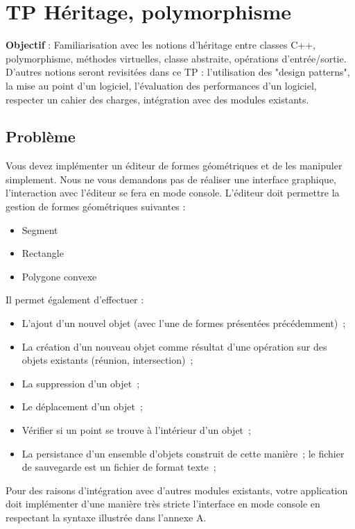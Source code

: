\documentclass[oneside]{book}
\begin{document}
 

\chapter*{TP Héritage, polymorphisme}
\textbf{Objectif} : Familiarisation avec les notions d'héritage entre classes C++, polymorphisme, méthodes virtuelles, classe abstraite, opérations d'entrée/sortie. D'autres notions seront revisitées dans ce TP : l'utilisation des "design patterns", la mise au point d'un logiciel, l'évaluation des performances d'un logiciel, respecter un cahier des charges, intégration avec des modules existants.

\section*{Problème}
Vous devez implémenter un éditeur de formes géométriques et de les manipuler simplement. Nous ne vous demandons pas de réaliser une interface graphique, l'interaction avec l'éditeur se fera en mode console.
L'éditeur doit permettre la gestion de formes géométriques suivantes :
\begin{itemize}
  \item Segment
  \item Rectangle
  \item Polygone convexe
\end{itemize}
Il permet également d'effectuer :
\begin{itemize}
  \item L'ajout d'un nouvel objet (avec l'une de formes présentées précédemment)~;
  \item La création d'un nouveau objet comme résultat d'une opération sur des objets existants (réunion, intersection)~;
  \item La suppression d'un objet~;
  \item Le déplacement d'un objet~;
  \item Vérifier si un point se trouve à l'intérieur d'un objet~;
  \item La persistance d'un ensemble d'objets construit de cette manière~; le fichier de sauvegarde est un fichier de format texte~;
\end{itemize}

Pour des raisons d'intégration avec d'autres modules existants, votre application doit implémenter d'une manière très stricte l'interface en mode console en respectant la syntaxe illustrée dans l'annexe A. 
\end{document}
